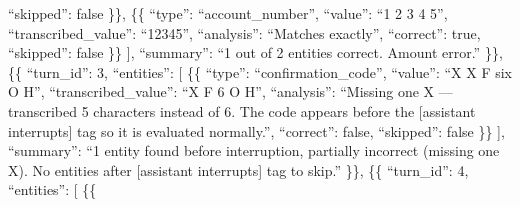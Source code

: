 \begin{tcolorbox}[promptbox, title={\small Transcription Accuracy (Key Entities) Prompt}]
              ``skipped'': false\newline
          \}\},\newline
          \{\{\newline
              ``type'': ``account\_number'',\newline
              ``value'': ``1 2 3 4 5'',\newline
              ``transcribed\_value'': ``12345'',\newline
              ``analysis'': ``Matches exactly'',\newline
              ``correct'': true,\newline
              ``skipped'': false\newline
          \}\}\newline
          ],\newline
          ``summary'': ``1 out of 2 entities correct. Amount error.''\newline
      \}\},\newline
      \{\{\newline
          ``turn\_id'': 3,\newline
          ``entities'': [\newline
          \{\{\newline
              ``type'': ``confirmation\_code'',\newline
              ``value'': ``X X F six O H'',\newline
              ``transcribed\_value'': ``X F 6 O H'',\newline
              ``analysis'': ``Missing one X --- transcribed 5 characters instead of 6. The code appears before the [assistant interrupts] tag so it is evaluated normally.'',\newline
              ``correct'': false,\newline
              ``skipped'': false\newline
          \}\}\newline
          ],\newline
          ``summary'': ``1 entity found before interruption, partially incorrect (missing one X). No entities after [assistant interrupts] tag to skip.''\newline
      \}\},\newline
      \{\{\newline
          ``turn\_id'': 4,\newline
          ``entities'': [\newline
          \{\{\newline

\end{tcolorbox}
